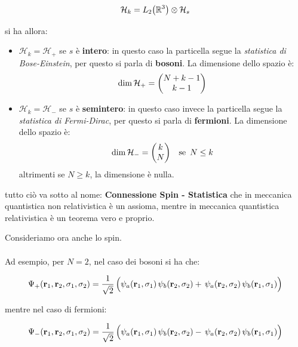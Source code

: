 \begin{myprinc}
\begin{enumerate}[label=\arabic*)]
	\begin{align*}
		\mathcal{H}_k = L_2\qty(\mathbb{R}^3) \otimes \mathcal{H}_s	
	\end{align*}
		
		si ha allora:
	
	\begin{itemize}
		\item $\mathcal{H}_k = \mathcal{H}_{+}$ se $s$ è \textbf{intero}: in questo caso la particella segue la \textit{statistica di Bose-Einstein}, per questo si parla di \textbf{bosoni}. La dimensione dello spazio è:
		\begin{align*}
			\dim \mathcal{H}_+ = \mqty(N + k -1 \\ k -1)
		\end{align*}
		
		\item $\mathcal{H}_k = \mathcal{H}_{-}$ se $s$ è \textbf{semintero}: in questo caso invece la particella segue la \textit{statistica di Fermi-Dirac}, per questo si parla di \textbf{fermioni}. La dimensione dello spazio è:
		\begin{align*}
			\dim \mathcal{H}_- = \mqty(k \\ N) \quad \text{se} \, \, \, N \leq k
		\end{align*}
			altrimenti se $ N \geq k$, la dimensione è nulla.
	\end{itemize}
	
	tutto ciò va sotto al nome: \textbf{Connessione Spin - Statistica} che in meccanica quantistica non relativistica è un assioma, mentre in meccanica quantistica relativistica è un teorema vero e proprio.

\end{enumerate}
\end{myprinc}

	Consideriamo ora anche lo spin. 
	\\
	\\
	Ad esempio, per $N = 2$, nel caso dei bosoni si ha che:
	
\begin{align*}
	\Psi_+ \qty(\vb{r}_1, \vb{r}_2, \sigma_1, \sigma_2) = \frac{1}{\sqrt{2}} \, \qty\Big( \psi_a\qty(\vb{r}_1, \sigma_1) \, \psi_b\qty(\vb{r}_2, \sigma_2) + \,  \psi_a\qty(\vb{r}_2, \sigma_2) \, \psi_b \qty(\vb{r}_1, \sigma_1)     )
\end{align*}

	mentre nel caso di fermioni:

\begin{align*}
	\Psi_- \qty(\vb{r}_1, \vb{r}_2, \sigma_1, \sigma_2) = \frac{1}{\sqrt{2}} \, \qty\Big( \psi_a\qty(\vb{r}_1, \sigma_1) \, \psi_b\qty(\vb{r}_2, \sigma_2) - \,  \psi_a\qty(\vb{r}_2, \sigma_2) \, \psi_b \qty(\vb{r}_1, \sigma_1)     )
\end{align*}

